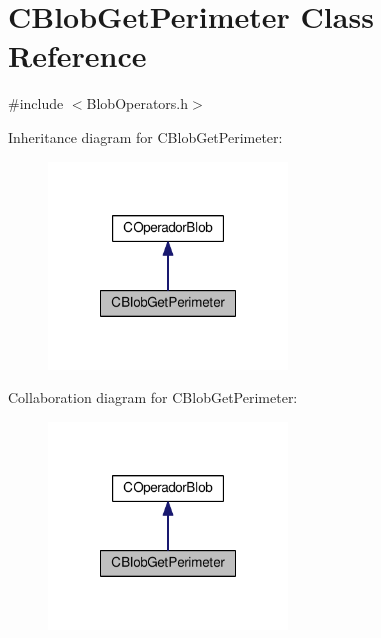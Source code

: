 \hypertarget{classCBlobGetPerimeter}{\section{C\-Blob\-Get\-Perimeter Class Reference}
\label{classCBlobGetPerimeter}
}


{\ttfamily \#include $<$Blob\-Operators.\-h$>$}



Inheritance diagram for C\-Blob\-Get\-Perimeter\-:\nopagebreak
\begin{figure}[H]
\begin{center}
\leavevmode
\includegraphics[width=180pt]{classCBlobGetPerimeter__inherit__graph}
\end{center}
\end{figure}


Collaboration diagram for C\-Blob\-Get\-Perimeter\-:\nopagebreak
\begin{figure}[H]
\begin{center}
\leavevmode
\includegraphics[width=180pt]{classCBlobGetPerimeter__coll__graph}
\end{center}
\end{figure}
